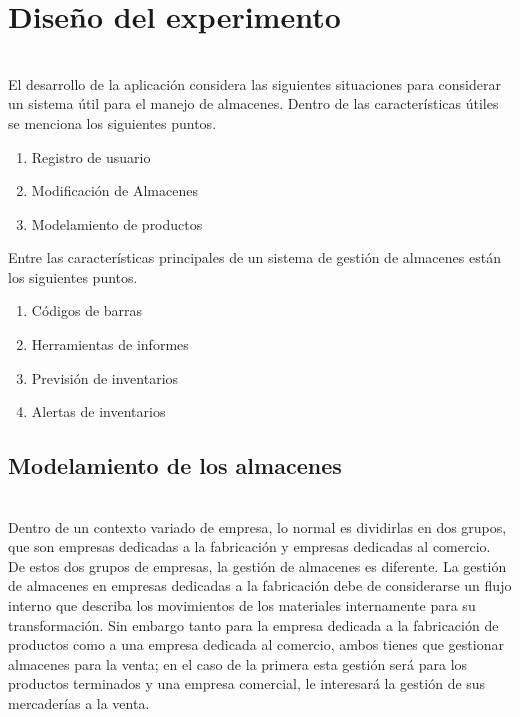 

\chapter{Diseño del experimento}

\\
El desarrollo de la aplicación considera las siguientes situaciones para considerar un sistema útil para el manejo de almacenes. Dentro de las características útiles se menciona los siguientes puntos.

\begin{enumerate}
\item Registro de usuario
\item Modificación de Almacenes
\item Modelamiento de productos
\end{enumerate}

Entre las características principales de un sistema de gestión de almacenes están los siguientes puntos.

\begin{enumerate}
\item Códigos de barras
\item Herramientas de informes
\item Previsión de inventarios
\item Alertas de inventarios
\end{enumerate}

\section{Modelamiento de los almacenes}

\\
Dentro de un contexto variado de empresa, lo normal es dividirlas en dos grupos, que son empresas dedicadas a la fabricación y empresas dedicadas al comercio. De estos dos grupos de empresas, la gestión de almacenes es diferente. La gestión de almacenes en empresas dedicadas a la fabricación debe de considerarse un flujo interno que describa los movimientos de los materiales internamente para su transformación. Sin embargo tanto para la empresa dedicada a la fabricación de productos como a una empresa dedicada al comercio, ambos tienes que gestionar almacenes para la venta; en el caso de la primera esta gestión será para los productos terminados y una empresa comercial, le interesará la gestión de sus mercaderías a la venta.\\

